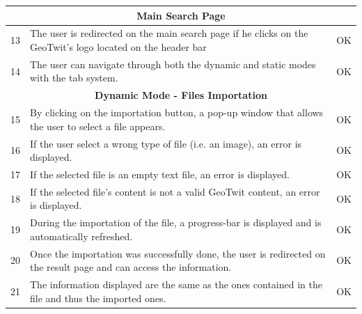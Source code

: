 \documentclass[a4paper,11pt]{report}
\begin{document}
\begin{center}
\begin{longtable}{|l|p{10cm}|p{4.4cm}|}
	\multicolumn{3}{|c|}{\textbf{Main Search Page}}\\\hline		
	13 & The user is redirected on the main search page if he clicks on the GeoTwit's logo located on the header bar & \color{ForestGreen}OK\color{black}\\\hline
	14 & The user can navigate through both the dynamic and static modes with the tab system. & \color{ForestGreen}OK\color{black}\\\hline
	
	\multicolumn{3}{|c|}{\textbf{Dynamic Mode - Files Importation}}\\\hline		15 & By clicking on the importation button, a pop-up window that allows the user to select a file appears. & \color{ForestGreen}OK\color{black}\\\hline
	16 & If the user select a wrong type of file (i.e. an image), an error is displayed. & \color{ForestGreen}OK\color{black}\\\hline
	17 & If the selected file is an empty text file, an error is displayed. & \color{ForestGreen}OK\color{black}\\\hline
	18 & If the selected file's content is not a valid GeoTwit content, an error is displayed. & \color{ForestGreen}OK\color{black}\\\hline
	19 & During the importation of the file, a progress-bar is displayed and is automatically refreshed. & \color{ForestGreen}OK\color{black}\\\hline
	20 & Once the importation was successfully done, the user is redirected on the result page and can access the information. & \color{ForestGreen}OK\color{black}\\\hline
	21 & The information displayed are the same as the ones contained in the file and thus the imported ones. & \color{ForestGreen}OK\color{black}\\\hline
	

\end{longtable}
\end{center}
\end{document}
